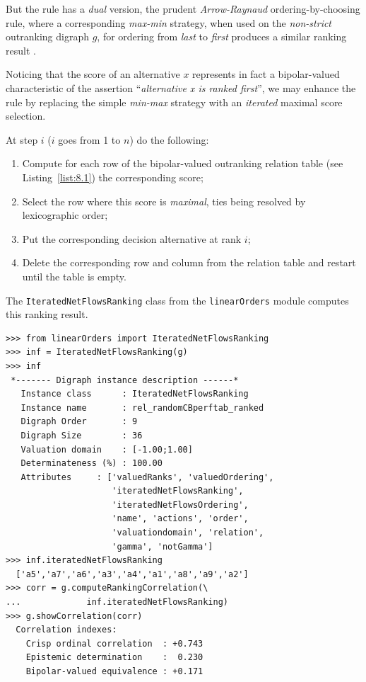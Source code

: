 But the \Kohler rule has a \emph{dual} version, the prudent \emph{Arrow-Raynaud} ordering-by-choosing rule, where a corresponding \emph{max-min} strategy, when used on the \emph{non-strict} outranking digraph $g$, for ordering from \emph{last} to \emph{first} produces a similar ranking result \citep{ARR-1986}.

Noticing that the \NetFlows score of an alternative $x$ represents in fact a bipolar-valued characteristic of the assertion ``\emph{alternative x is ranked first}'', we may enhance the \Kohler rule by replacing the simple \emph{min-max} strategy with an \emph{iterated} maximal \NetFlows score selection.

\begin{definition}
  
\noindent At step $i$ ($i$ goes from 1 to $n$) do the following:
\begin{enumerate}[leftmargin=0.5cm,rightmargin=0.5cm,topsep=1pt]
\item Compute for each row of the bipolar-valued outranking relation table (see Listing~\vref{list:8.1}) the corresponding \NetFlows score;
\item Select the row where this score is \emph{maximal}, ties being resolved by lexicographic order;
\item Put the corresponding decision alternative at rank $i$;
\item Delete the corresponding row and column from the relation table and restart until the table is empty.
\end{enumerate}
\end{definition}

The \texttt{IteratedNetFlowsRanking} class from the \texttt{linearOrders} module computes this ranking result. 
\begin{lstlisting}[caption={Ranking-by-choosing with iterated maximal \NetFlows scores},label=list:8.14]   
>>> from linearOrders import IteratedNetFlowsRanking  
>>> inf = IteratedNetFlowsRanking(g)
>>> inf
 *------- Digraph instance description ------*
   Instance class      : IteratedNetFlowsRanking
   Instance name       : rel_randomCBperftab_ranked
   Digraph Order       : 9
   Digraph Size        : 36
   Valuation domain    : [-1.00;1.00]
   Determinateness (%) : 100.00
   Attributes     : ['valuedRanks', 'valuedOrdering',
                     'iteratedNetFlowsRanking',
                     'iteratedNetFlowsOrdering',
                     'name', 'actions', 'order',
                     'valuationdomain', 'relation',
                     'gamma', 'notGamma']
>>> inf.iteratedNetFlowsRanking
  ['a5','a7','a6','a3','a4','a1','a8','a9','a2']
>>> corr = g.computeRankingCorrelation(\
...             inf.iteratedNetFlowsRanking)
>>> g.showCorrelation(corr)
  Correlation indexes:
    Crisp ordinal correlation  : +0.743
    Epistemic determination    :  0.230
    Bipolar-valued equivalence : +0.171
\end{lstlisting}

